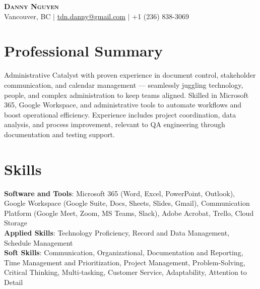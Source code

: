 \documentclass[letterpaper,11pt]{article}
\begin{document}
\begin{center}
\textbf{\Huge \scshape Danny Nguyen} \\ \vspace{1pt}
\small Vancouver, BC $|$ \href{mailto:tdn.danny@gmail.com}{\underline{tdn.danny@gmail.com}} $|$ +1 (236) 838-3069
\end{center}


\section{Professional Summary} %
Administrative Catalyst with proven experience in document control, stakeholder communication, and calendar management — seamlessly juggling technology, people, and complex administration to keep teams aligned. Skilled in Microsoft 365, Google Workspace, and administrative tools to automate workflows and boost operational efficiency. Experience includes project coordination, data analysis, and process improvement, relevant to QA engineering through documentation and testing support.

\section{Skills}
\begin{itemize}[leftmargin=0.15in, label={}]
\small{\item{\textbf{Software and Tools}{: Microsoft 365 (Word, Excel, PowerPoint, Outlook), Google Workspace (Google Suite, Docs, Sheets, Slides, Gmail), Communication Platform (Google Meet, Zoom, MS Teams, Slack), Adobe Acrobat, Trello, Cloud Storage} \\
\textbf{Applied Skills}{: Technology Proficiency, Record and Data Management, Schedule Management} \\
\textbf{Soft Skills}{: Communication, Organizational, Documentation and Reporting, Time Management and Prioritization, Project Management, Problem-Solving, Critical Thinking, Multi-tasking, Customer Service, Adaptability, Attention to Detail}}}
\end{itemize}
\end{document}

